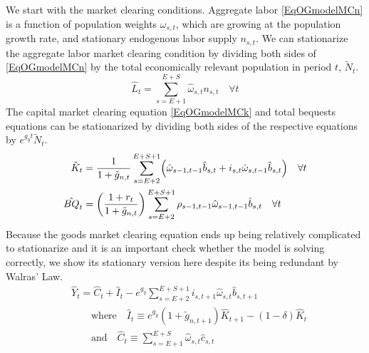 \documentclass[letterpaper,12pt]{article}
\theoremstyle{definition}
\begin{document}
    We start with the market clearing conditions. Aggregate labor \eqref{EqOGmodelMCn} is a function of population weights $\omega_{s,t}$, which are growing at the population growth rate, and stationary endogenous labor supply $n_{s,t}$. We can stationarize the aggregate labor market clearing condition by dividing both sides of \eqref{EqOGmodelMCn} by the total economically relevant population in period $t$, $\tilde{N}_t$.
    \begin{equation}\label{EqOGmodelMCnStat}
      \hat{L}_t = \sum_{s=E+1}^{E+S}\hat{\omega}_{s,t}n_{s,t} \quad\forall t
    \end{equation}
    The capital market clearing equation \eqref{EqOGmodelMCk} and total bequests equations can be stationarized by dividing both sides of the respective equations by $e^{g_y t}\tilde{N}_t$.
    \begin{align}
      \hat{K}_t &= \frac{1}{1 + \tilde{g}_{n,t}}\sum_{s=E+2}^{E+S+1}\Bigl(\hat{\omega}_{s-1,t-1}\hat{b}_{s,t} + i_{s,t}\hat{\omega}_{s,t-1}\hat{b}_{s,t}\Bigr) \quad\forall t \label{EqOGmodelMCkStat} \\
      \hat{BQ}_t &= \left(\frac{1 + r_t}{1 + \tilde{g}_{n,t}}\right)\sum_{s=E+2}^{E+S+1}\rho_{s-1,t-1}\hat{\omega}_{s-1,t-1}\hat{b}_{s,t} \quad\forall t \label{EqOGmodelBQstat}
    \end{align}
    Because the goods market clearing equation ends up being relatively complicated to stationarize and it is an important check whether the model is solving correctly, we show its stationary version here despite its being redundant by Walras' Law.
    \begin{equation}\label{EqOGmodelMCyStat}
      \begin{split}
        & \hat{Y}_t = \hat{C}_t + \hat{I}_t - e^{g_y}\sum_{s=E+2}^{E+S+1}i_{s,t+1}\hat{\omega}_{s,t}\hat{b}_{s,t+1}\\
        &\qquad\text{where}\quad \hat{I}_t \equiv e^{g_y}(1 + \tilde{g}_{n,t+1})\hat{K}_{t+1} - (1-\delta)\hat{K}_t \\
        &\qquad\text{and}\quad \hat{C}_t \equiv \sum_{s=E+1}^{E+S}\hat{\omega}_{s,t}\hat{c}_{s,t}
      \end{split}
    \end{equation}
\end{document}
